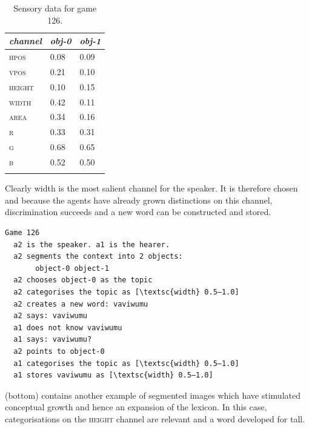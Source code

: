\begin{table}
\begin{center}
\begin{tabular}{lll}
\lsptoprule
{\itshape channel}& {\itshape obj-0} & {\itshape obj-1}\\ \midrule
\textsc{hpos} & 0.08 & 0.09\\ 
\textsc{vpos} & 0.21 & 0.10\\ 
\textsc{height} & 0.10 & 0.15\\ 
\textsc{width} & 0.42 & 0.11\\ 
\textsc{area} & 0.34 & 0.16\\ 
\textsc{r} & 0.33 & 0.31\\ 
\textsc{g} & 0.68 & 0.65\\ 
\textsc{b} & 0.52 & 0.50\\ 
\lspbottomrule
\end{tabular}
\caption{\label{tab:game126}Sensory data for game 126.}
\end{center}
\end{table}
Clearly width is the most salient channel for the speaker. 
It is therefore chosen and because the 
agents have already grown distinctions on this channel, 
discrimination succeeds and a new word can be
constructed and stored. 
\begin{verbatim}
Game 126 
  a2 is the speaker. a1 is the hearer. 
  a2 segments the context into 2 objects: 
       object-0 object-1
  a2 chooses object-0 as the topic 
  a2 categorises the topic as [\textsc{width} 0.5–1.0]
  a2 creates a new word: vaviwumu
  a2 says: vaviwumu
  a1 does not know vaviwumu
  a1 says: vaviwumu?
  a2 points to object-0
  a1 categorises the topic as [\textsc{width} 0.5–1.0]
  a1 stores vaviwumu as [\textsc{width} 0.5–1.0]
\end{verbatim}
 (bottom) contains another example
of segmented images which have stimulated conceptual
growth and hence an expansion of the lexicon. 
In this case, categorisations on the \textsc{height} channel are
relevant and a word developed for tall.

